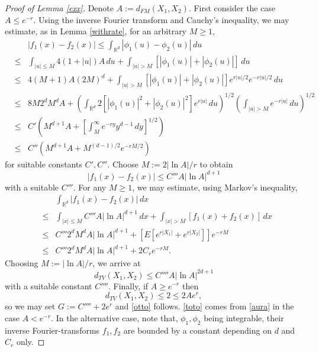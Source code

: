 \documentclass{article}
\begin{document}
\begin{proof}[Proof of Lemma \ref{exx}]
Denote $A:=d_{FM}(X_{1},X_{2})$. First consider the case $A\leq e^{-r}$.
Using the inverse Fourier transform and Cauchy's inequality, we may estimate, as in Lemma \ref{withrate},
for an arbitrary $M\geq 1$,
\begin{eqnarray*}
& & |f_{1}(x)-f_{2}(x)|\leq \int_{\mathbb{R}^{d}}|\phi_{1}(u)-\phi_{2}(u)|\, du\\
&\leq& \int_{|u|\leq M}	4(1+|u|)A\, du+\int_{|u|>M}[|\phi_{1}(u)|+|\phi_{2}(u)|]\, du\\
&\leq& 4(M+1)A (2M)^{d}+ \int_{|u|>M}[|\phi_{1}(u)|+|\phi_{2}(u)|]e^{r|u|/2}e^{-r|u|/2}\, du\\
&\leq& 8M 2^{d}M^{d}A+\left({}
\int_{\mathbb{R}^{d}}2[|\phi_{1}(u)|^{2}+|\phi_{2}(u)|^{2}]e^{r|u|}\, du
\right)^{1/2}\left({}
\int_{|u|>M}e^{-r|u|}\, du
\right)^{1/2}\\
&\leq& C'\left(M^{d+1}A+\left[\int_{M}^{\infty}e^{-ry}y^{d-1}\, dy\right]^{1/2}\right)\\
&\leq& C''\left(M^{d+1}A+M^{(d-1)/2}e^{-rM/2}\right)
\end{eqnarray*}	
for suitable constants $C',C''$.
Choose $M:=2|\ln A|/r$ to obtain
\begin{equation}\label{aura}
|f_{1}(x)-f_{2}(x)|\leq C'''A|\ln A|^{d+1}
\end{equation}
with a suitable $C'''$. 
For any $M\geq 1$, we may estimate, using Markov's inequality,
\begin{eqnarray*}
& & \int_{\mathbb{R}^{d}}|f_{1}(x)-f_{2}(x)|\, dx\\
&\leq& \int_{|x|\leq M}C'''A |\ln A|^{d+1}\, dx +\int_{|x|>M} [f_{1}(x)+f_{2}(x)]\, dx\\
&\leq& C'''2^{d}M^{d}A |\ln A|^{d+1}+\left[E[e^{r|X_{1}|}+e^{r|X_{2}|}]\right]e^{-rM}\\
&\leq& C'''2^{d}M^{d}A |\ln A|^{d+1}+2C_{r}e^{-rM}.	
\end{eqnarray*} 
Choosing $M:=|\ln A|/r$, we arrive at
$$
d_{TV}(X_{1},X_{2})\leq C''''A|\ln A|^{2d+1}
$$
with a suitable constant $C''''$. Finally, if $A\geq e^{-r}$ then
$$
d_{TV}(X_{1},X_{2})\leq 2\leq 2Ae^{r},
$$
so we may set $G:=C''''+2e^{r}$ and \eqref{otto} follows. \eqref{toto} comes from \eqref{aura} in the case $A< e^{-r}$.
In the alternative case, note that, $\phi_{1},\phi_{2}$ being integrable, 
their inverse Fourier-transforms $f_{1},f_{2}$ are bounded by a constant depending on $d$ and $C_{r}$ only.
\end{proof}
\end{document}
